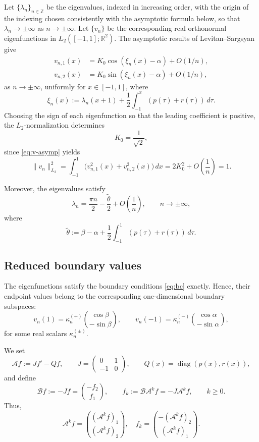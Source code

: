 \documentclass[11pt,a4paper]{article}
\theoremstyle{definition}
\begin{document}
Let $\{\lambda_n\}_{n\in\mathbb Z}$ be the eigenvalues, indexed in
increasing order, with the origin of the indexing chosen consistently
with the asymptotic formula below, so that
$\lambda_n\to\pm\infty$ as $n\to\pm\infty$. Let $\{v_n\}$ be the
corresponding real orthonormal eigenfunctions in
$L_2([-1,1];\mathbb R^2)$. The asymptotic results of
Levitan--Sargsyan \cite{LS} give
\begin{equation}\label{eq:v-asymp}
\begin{aligned}
v_{n,1}(x) &= K_0\cos(\xi_n(x)-\alpha) + O(1/n),\\
v_{n,2}(x) &= K_0\sin(\xi_n(x)-\alpha) + O(1/n),
\end{aligned}
\end{equation}
as $n\to\pm\infty$, uniformly for $x\in[-1,1]$, where
\begin{equation}\label{eq:xi-def}
\xi_n(x)
:=
\lambda_n(x+1)
+
\frac{1}{2}\int_{-1}^{x}(p(\tau)+r(\tau))\,d\tau.
\end{equation}
Choosing the sign of each eigenfunction so that the leading coefficient
is positive, the $L_2$-normalization determines
\[
K_0=\frac{1}{\sqrt{2}},
\]
since \eqref{eq:v-asymp} yields
\[
\|v_n\|_{L_2}^2
=
\int_{-1}^{1}
\bigl(v_{n,1}^2(x)+v_{n,2}^2(x)\bigr)\,dx
=
2K_0^2+O\!\left(\frac{1}{n}\right)
=
1.
\]

Moreover, the eigenvalues satisfy \cite{LS}
\begin{equation}\label{eq:lam-asymp}
\lambda_n
=
\frac{\pi n}{2}
-
\frac{\widetilde\theta}{2}
+
O\!\left(\frac{1}{n}\right),
\qquad
n\to\pm\infty,
\end{equation}
where
\[
\widetilde\theta
:=
\beta-\alpha
+
\frac{1}{2}\int_{-1}^{1}(p(\tau)+r(\tau))\,d\tau.
\]
\subsection{Reduced boundary values}\label{ssec:reduced}

The eigenfunctions satisfy the boundary conditions \eqref{eq:bc}
exactly. Hence, their endpoint values belong to the corresponding
one-dimensional boundary subspaces:
\begin{equation}\label{eq:rank1}
v_n(1)
=
\kappa_n^{(+)}
\binom{\cos\beta}{-\sin\beta},
\qquad
v_n(-1)
=
\kappa_n^{(-)}
\binom{\cos\alpha}{-\sin\alpha},
\end{equation}
for some real scalars $\kappa_n^{(\pm)}$.

We set
\[
\mathcal Af:=Jf'-Qf,
\qquad
J=
\begin{pmatrix}
0&1\\
-1&0
\end{pmatrix},
\qquad
Q(x)=\operatorname{diag}(p(x),r(x)),
\]
and define
\begin{equation}\label{eq:B-fk-def}
\mathcal Bf:=-Jf=\binom{-f_2}{f_1},
\qquad
f_k:=\mathcal B\mathcal A^k f=-J\mathcal A^k f,
\qquad
k\geq0.
\end{equation}
Thus,
\begin{equation}\label{eq:fk-components}
\mathcal A^k f
=
\binom{(\mathcal A^k f)_1}{(\mathcal A^k f)_2}, \quad f_k
=
\binom{-(\mathcal A^k f)_2}{(\mathcal A^k f)_1}.
\end{equation}
\end{document}
